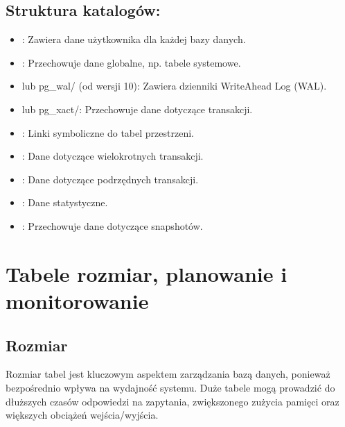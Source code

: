 \documentclass[letterpaper,10pt,polish]{sphinxmanual}
\begin{document}
\subsection{Struktura katalogów:}
\label{\detokenize{Konfiguracja-bazy-danych:struktura-katalogow}}\begin{itemize}
\item {} 
\sphinxAtStartPar
{}: Zawiera dane użytkownika dla każdej bazy danych.

\item {} 
\sphinxAtStartPar
{}: Przechowuje dane globalne, np. tabele systemowe.

\item {} 
\sphinxAtStartPar
{} lub pg\_wal/ (od wersji 10): Zawiera dzienniki Write\sphinxhyphen{}Ahead Log (WAL).

\item {} 
\sphinxAtStartPar
{} lub pg\_xact/: Przechowuje dane dotyczące transakcji.

\item {} 
\sphinxAtStartPar
{}: Linki symboliczne do tabel przestrzeni.

\item {} 
\sphinxAtStartPar
{}: Dane dotyczące wielokrotnych transakcji.

\item {} 
\sphinxAtStartPar
{}: Dane dotyczące podrzędnych transakcji.

\item {} 
\sphinxAtStartPar
{}: Dane statystyczne.

\item {} 
\sphinxAtStartPar
{}: Przechowuje dane dotyczące snapshotów.

\end{itemize}


\section{Tabele \sphinxhyphen{} rozmiar, planowanie i monitorowanie}
\label{\detokenize{Konfiguracja-bazy-danych:tabele-rozmiar-planowanie-i-monitorowanie}}

\subsection{Rozmiar}
\label{\detokenize{Konfiguracja-bazy-danych:rozmiar}}
\sphinxAtStartPar
Rozmiar tabel jest kluczowym aspektem zarządzania bazą danych, ponieważ bezpośrednio wpływa na wydajność systemu. Duże tabele mogą prowadzić do dłuższych czasów odpowiedzi na zapytania, zwiększonego zużycia pamięci oraz większych obciążeń wejścia/wyjścia.
\end{document}
